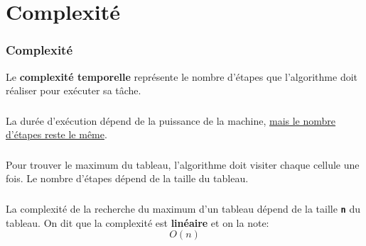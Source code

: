 \documentclass[svgnames,11pt]{beamer}
\begin{document}
\section{Complexité}
\begin{frame}
    \frametitle{Complexité}

    \begin{aretenir}[]
        Le \textbf{complexité temporelle} représente le nombre d'étapes que l'algorithme doit réaliser pour exécuter sa tâche.
    \end{aretenir}

\end{frame}
\begin{frame}
    \frametitle{}

    \begin{aretenir}[Remarque]
        La durée d'exécution dépend de la puissance de la machine, \underline{mais le nombre d'étapes reste le même}.
    \end{aretenir}

\end{frame}
\begin{frame}
    \frametitle{}

    \begin{center}
    \end{center}
    \begin{center}
        Pour trouver le maximum du tableau, l'algorithme doit visiter chaque cellule une fois. Le nombre d'étapes dépend de la taille du tableau.
    \end{center}

\end{frame}
\begin{frame}
    \frametitle{}

    \begin{center}
    \end{center}
    \begin{aretenir}[]
        La complexité de la recherche du maximum d'un tableau dépend de la taille \textbf{\texttt{n}} du tableau. On dit que la complexité est \textbf{linéaire} et on la note:
        $$O(n)$$
    \end{aretenir}

\end{frame}
\end{document}
